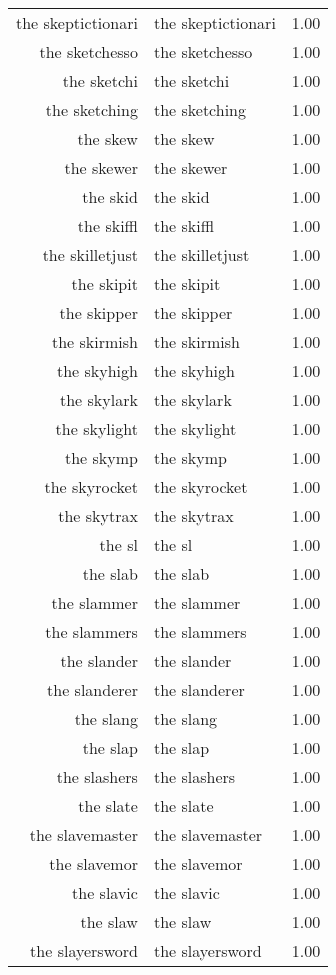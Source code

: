\begin{table}[ht]
\begin{tabular}{rlr}
  the skeptictionari & the skeptictionari & 1.00 \\ 
  the sketchesso & the sketchesso & 1.00 \\ 
  the sketchi & the sketchi & 1.00 \\ 
  the sketching & the sketching & 1.00 \\ 
  the skew & the skew & 1.00 \\ 
  the skewer & the skewer & 1.00 \\ 
  the skid & the skid & 1.00 \\ 
  the skiffl & the skiffl & 1.00 \\ 
  the skilletjust & the skilletjust & 1.00 \\ 
  the skipit & the skipit & 1.00 \\ 
  the skipper & the skipper & 1.00 \\ 
  the skirmish & the skirmish & 1.00 \\ 
  the skyhigh & the skyhigh & 1.00 \\ 
  the skylark & the skylark & 1.00 \\ 
  the skylight & the skylight & 1.00 \\ 
  the skymp & the skymp & 1.00 \\ 
  the skyrocket & the skyrocket & 1.00 \\ 
  the skytrax & the skytrax & 1.00 \\ 
  the sl & the sl & 1.00 \\ 
  the slab & the slab & 1.00 \\ 
  the slammer & the slammer & 1.00 \\ 
  the slammers & the slammers & 1.00 \\ 
  the slander & the slander & 1.00 \\ 
  the slanderer & the slanderer & 1.00 \\ 
  the slang & the slang & 1.00 \\ 
  the slap & the slap & 1.00 \\ 
  the slashers & the slashers & 1.00 \\ 
  the slate & the slate & 1.00 \\ 
  the slavemaster & the slavemaster & 1.00 \\ 
  the slavemor & the slavemor & 1.00 \\ 
  the slavic & the slavic & 1.00 \\ 
  the slaw & the slaw & 1.00 \\ 
  the slayersword & the slayersword & 1.00 \\ 

\end{tabular}
\end{table}
